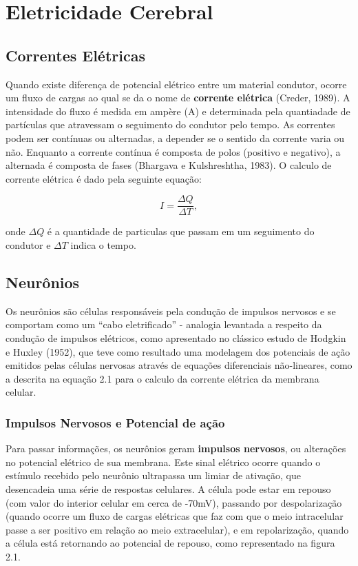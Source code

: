 \chapter{Eletricidade Cerebral}



\section{Correntes Elétricas}
Quando existe diferença de potencial elétrico entre um material condutor, 
ocorre um fluxo de cargas ao qual se da o nome de \textbf{corrente elétrica} (Creder, 1989).
A intensidade do fluxo é medida em ampère (A) e determinada pela quantiadade de partículas que atravessam o seguimento
do condutor pelo tempo. As correntes podem ser contínuas ou alternadas, a depender se o sentido da corrente varia ou não. Enquanto a corrente contínua 
é composta de polos (positivo e negativo), a alternada é composta de fases (Bhargava e Kulshreshtha, 1983). O calculo de corrente elétrica é 
dado pela seguinte equação:

\begin{equation}
    I = \frac{\Delta Q }{\Delta T},
\end{equation}

onde $\Delta Q$ é a quantidade de particulas que passam em um seguimento do condutor e $\Delta T$ indica o tempo. 

\section{Neurônios}
Os neurônios são células responsáveis pela condução de impulsos nervosos e se comportam como um “cabo eletrificado” - analogia
levantada a respeito da condução de impulsos elétricos, como apresentado no clássico estudo de Hodgkin e Huxley (1952), 
que teve como resultado uma modelagem dos potenciais de ação emitidos pelas células 
nervosas através de equações diferenciais não-lineares, como a descrita na equação 2.1 
para o calculo da corrente elétrica da membrana celular. 

\subsection{Impulsos Nervosos e Potencial de ação}
Para passar informações, os neurônios geram \textbf{impulsos nervosos}, ou alterações no potencial elétrico de sua membrana. Este sinal elétrico
ocorre quando o estímulo recebido pelo neurônio ultrapassa um limiar de ativação, que desencadeia uma série de respostas celulares. A célula pode 
estar em repouso (com valor do interior celular em cerca de -70mV), passando por despolarização (quando ocorre um fluxo de cargas elétricas que faz com 
que o meio intracelular passe a ser positivo em relação ao meio extracelular), e em repolarização, quando a célula está retornando ao potencial de repouso,
como representado na figura 2.1. 

